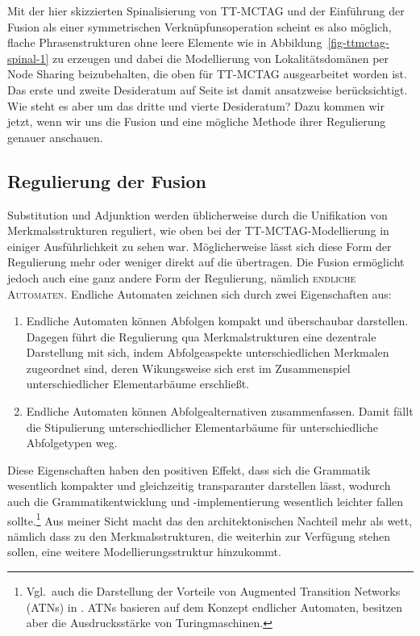 Mit der hier skizzierten Spinalisierung von TT-MCTAG und der Einführung der Fusion als einer symmetrischen Verknüpfunsoperation scheint es also möglich, flache Phrasenstrukturen ohne leere Elemente wie in Abbildung~\ref{fig-ttmctag-spinal-1} zu erzeugen und dabei die Modellierung von Lokalitätsdomänen per Node Sharing  beizubehalten, die oben für TT-MCTAG ausgearbeitet worden ist. Das erste und zweite Desideratum auf Seite \pageref{enum-ttmctag-spinal} ist damit ansatzweise berücksichtigt. Wie steht es aber um das dritte und vierte Desideratum? Dazu kommen wir jetzt, wenn wir uns die Fusion und eine mögliche Methode ihrer Regulierung genauer anschauen.   
 

\subsection{Regulierung der Fusion}

Substitution und Adjunktion werden üblicherweise durch die Unifikation von Merkmalsstrukturen reguliert, wie oben bei der TT-MCTAG-Modellierung in einiger Ausführlichkeit zu sehen war. Möglicherweise lässt sich diese Form der Regulierung mehr oder weniger direkt auf die  übertragen. Die Fusion ermöglicht jedoch auch eine ganz andere Form der Regulierung, nämlich \textsc{endliche Automaten}. Endliche Automaten zeichnen sich durch zwei Eigenschaften aus:

\begin{enumerate}
  \item Endliche Automaten können Abfolgen kompakt und überschaubar darstellen. Dagegen führt die Regulierung qua Merkmalstrukturen eine dezentrale Darstellung mit sich, indem Abfolgeaspekte unterschiedlichen Merkmalen zugeordnet sind, deren Wikungsweise sich erst im Zusammenspiel unterschiedlicher Elementarbäume erschlie\ss t.
\item Endliche Automaten können Abfolgealternativen zusammenfassen. Damit fällt die Stipulierung unterschiedlicher Elementarbäume für unterschiedliche Abfolgetypen weg. 
\end{enumerate}

Diese Eigenschaften haben den positiven Effekt, dass sich die Grammatik wesentlich kompakter und gleichzeitig transparanter darstellen lässt, wodurch auch die Grammatikentwicklung und -implementierung wesentlich leichter fallen sollte.\footnote{Vgl.\ auch die Darstellung der Vorteile von Augmented Transition Networks (ATNs) in \citet[599ff]{Woods:70}. ATNs basieren auf dem Konzept endlicher Automaten, besitzen aber die Ausdrucksstärke von Turingmaschinen.} 
Aus meiner Sicht macht das den architektonischen Nachteil mehr als wett, nämlich dass zu den Merkmalsstrukturen, die weiterhin zur Verfügung stehen sollen, eine weitere Modellierungsstruktur hinzukommt. 

